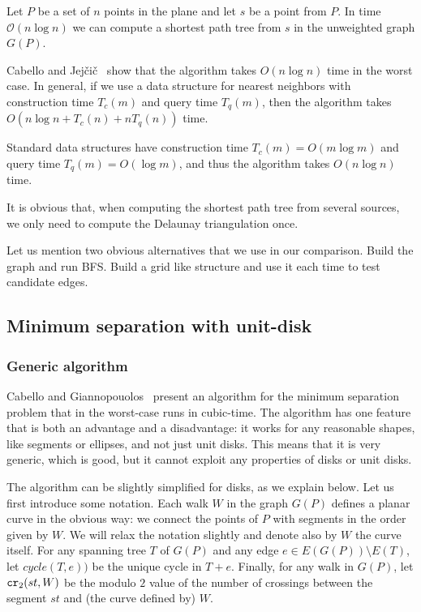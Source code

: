 \documentclass[a4paper,USenglish,numberwithinsect]{lipics}
\newcommand{\cycle}{\mathit{cycle}}
\newcommand\CR{\mbox{\tt cr}_2}		  %
\begin{document}
\begin{theorem}
  Let $P$ be a set of $n$ points in the plane and let $s$ be a point from $P$. 
  In time ${\mathcal O}(n \log n)$ we can compute a shortest path tree from $s$
  in the unweighted graph $G(P)$.
\end{theorem}

Cabello and Jej\v{c}i\v{c}~\cite{CJ15} show that the algorithm takes $O(n\log n)$ time
in the worst case. 
In general, if we use a data structure for nearest neighbors with construction time $T_c(m)$
and query time $T_q(m)$, then the algorithm takes $O(n\log n + T_c(n)+ n T_q(n))$ time.

Standard data structures have construction time $T_c(m)=O(m\log m)$ and 
query time $T_q(m)=O(\log m)$, and thus the algorithm takes $O(n\log n)$ time.

It is obvious that, when computing the shortest path tree from several sources,
we only need to compute the Delaunay triangulation once.

Let us mention two obvious alternatives that we use in our comparison.
Build the graph and run BFS.
Build a grid like structure and use it each time to test candidate edges.


\subsection{Minimum separation with unit-disk}
\label{sec:algorithm-separation}

\subsubsection*{Generic algorithm}
Cabello and Giannopouolos~\cite{CG16} present an algorithm
for the minimum separation problem that in the worst-case runs in cubic-time.
The algorithm has one feature that is both an advantage and a disadvantage: 
it works for any reasonable shapes, like segments or ellipses, and not just unit disks.
This means that it is very generic, which is good,
but it cannot exploit any properties of disks or unit disks.

The algorithm can be slightly simplified for disks, as we explain below. 
Let us first introduce some notation.
Each walk $W$ in the graph $G(P)$ defines a planar curve
in the obvious way: we connect the points of $P$ 
with segments in the order given by $W$. 
We will relax the notation slightly and denote also by $W$ the curve itself.
For any spanning tree $T$ of $G(P)$ and any edge $e\in E(G(P))\setminus E(T)$, 
let $\cycle(T,e))$ be the unique cycle in $T+e$.
Finally, for any walk in $G(P)$, let $\CR (st,W)$ be the 
modulo $2$ value of the number of crossings between the segment $st$ 
and (the curve defined by) $W$.
\end{document}
